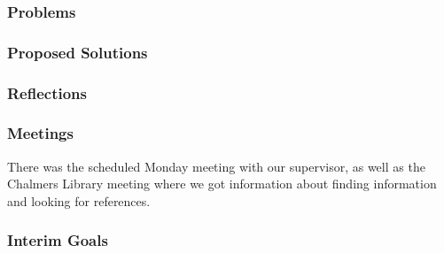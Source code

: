 \subsubsection{Problems}


\subsubsection{Proposed Solutions}


\subsubsection{Reflections}

    

\subsubsection{Meetings}
    There was the scheduled Monday meeting with our supervisor, as well as the Chalmers Library meeting where we got information about finding information and looking for references.

\subsubsection{Interim Goals}


